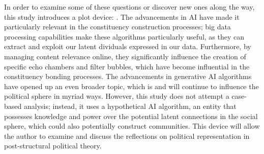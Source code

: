 %


In order to examine some of these questions or discover new ones along the way, this study introduces a plot device: . The advancements in AI have made it particularly relevant in the constituency construction processes; big data processing capabilities make these algorithms particularly useful, as they can extract and exploit our latent dividuals expressed in our data. Furthermore, by managing content relevance online, they significantly influence the creation of specific echo chambers and filter bubbles, which have become influential in the constituency bonding processes. The advancements in generative AI algorithms have opened up an even broader topic, which is and will continue to influence the political sphere in myriad ways. However, this study does not attempt a case-based analysis; instead, it uses a hypothetical AI algorithm, an entity that possesses knowledge and power over the potential latent connections in the social sphere, which could also potentially construct communities. This device will allow the author to examine and discuss the reflections on political representation in post-structural political theory.

\printbibliography

